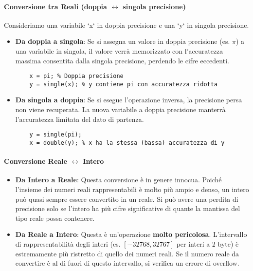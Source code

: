 \paragraph{Conversione tra Reali (doppia $\leftrightarrow$ singola precisione)}
Consideriamo una variabile `x` in doppia precisione e una `y` in singola precisione.
\begin{itemize}
    \item \textbf{Da doppia a singola}: Se si assegna un valore in doppia precisione (es. $\pi$) a una variabile in singola, il valore verrà memorizzato con l'accuratezza massima consentita dalla singola precisione, perdendo le cifre eccedenti.
    \begin{verbatim}
    x = pi; % Doppia precisione
    y = single(x); % y contiene pi con accuratezza ridotta
    \end{verbatim}
    
    \item \textbf{Da singola a doppia}: Se si esegue l'operazione inversa, la precisione persa non viene recuperata. La nuova variabile a doppia precisione manterrà l'accuratezza limitata del dato di partenza.
    \begin{verbatim}
    y = single(pi);
    x = double(y); % x ha la stessa (bassa) accuratezza di y
    \end{verbatim}
\end{itemize}

\paragraph{Conversione Reale $\leftrightarrow$ Intero}
\begin{itemize}
    \item \textbf{Da Intero a Reale}: Questa conversione è in genere innocua. Poiché l'insieme dei numeri reali rappresentabili è molto più ampio e denso, un intero può quasi sempre essere convertito in un reale. Si può avere una perdita di precisione solo se l'intero ha più cifre significative di quante la mantissa del tipo reale possa contenere.
    
    \item \textbf{Da Reale a Intero}: Questa è un'operazione \textbf{molto pericolosa}. L'intervallo di rappresentabilità degli interi (es. $[-32768, 32767]$ per interi a 2 byte) è estremamente più ristretto di quello dei numeri reali. Se il numero reale da convertire è al di fuori di questo intervallo, si verifica un errore di overflow.
\end{itemize}

